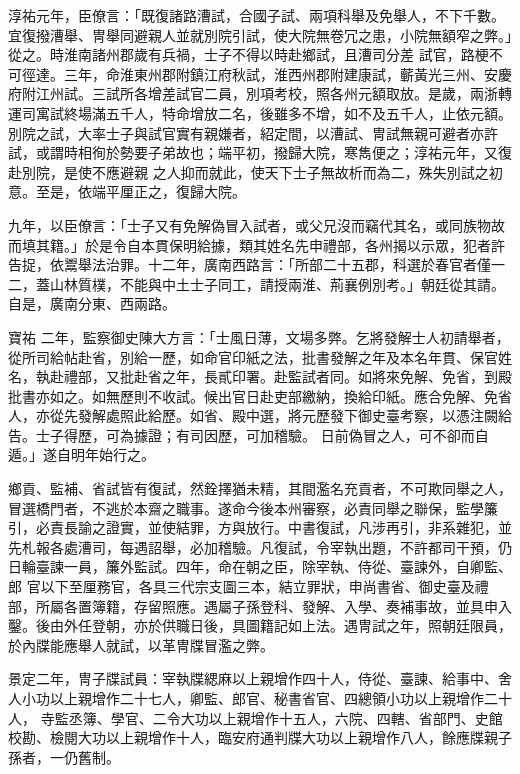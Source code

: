 \begin{pinyinscope}
 淳祐元年，臣僚言：「既復諸路漕試，合國子試、兩項科舉及免舉人，不下千數。宜復撥漕舉、冑舉同避親人並就別院引試，使大院無卷冗之患，小院無額窄之弊。」從之。時淮南諸州郡歲有兵禍，士子不得以時赴鄉試，且漕司分差
 試官，路梗不可徑達。三年，命淮東州郡附鎮江府秋試，淮西州郡附建康試，蘄黃光三州、安慶府附江州試。三試所各增差試官二員，別項考校，照各州元額取放。是歲，兩浙轉運司寓試終場滿五千人，特命增放二名，後雖多不增，如不及五千人，止依元額。別院之試，大率士子與試官實有親嫌者，紹定間，以漕試、冑試無親可避者亦許試，或謂時相徇於勢要子弟故也；端平初，撥歸大院，寒雋便之；淳祐元年，又復赴別院，是使不應避親
 之人抑而就此，使天下士子無故析而為二，殊失別試之初意。至是，依端平厘正之，復歸大院。



 九年，以臣僚言：「士子又有免解偽冒入試者，或父兄沒而竊代其名，或同族物故而填其籍。」於是令自本貫保明給據，類其姓名先申禮部，各州揭以示眾，犯者許告捉，依鬻舉法治罪。十二年，廣南西路言：「所部二十五郡，科選於春官者僅一二，蓋山林質樸，不能與中土士子同工，請授兩淮、荊襄例別考。」朝廷從其請。自是，廣南分東、西兩路。



 寶祐
 二年，監察御史陳大方言：「士風日薄，文場多弊。乞將發解士人初請舉者，從所司給帖赴省，別給一歷，如命官印紙之法，批書發解之年及本名年貫、保官姓名，執赴禮部，又批赴省之年，長貳印署。赴監試者同。如將來免解、免省，到殿批書亦如之。如無歷則不收試。候出官日赴吏部繳納，換給印紙。應合免解、免省人，亦從先發解處照此給歷。如省、殿中選，將元歷發下御史臺考察，以憑注闕給告。士子得歷，可為據證；有司因歷，可加稽驗。
 日前偽冒之人，可不卻而自遁。」遂自明年始行之。



 鄉貢、監補、省試皆有復試，然銓擇猶未精，其間濫名充貢者，不可欺同舉之人，冒選橋門者，不逃於本齋之職事。遂命今後本州審察，必責同舉之聯保，監學簾引，必責長諭之證實，並使結罪，方與放行。中書復試，凡涉再引，非系雜犯，並先札報各處漕司，每遇詔舉，必加稽驗。凡復試，令宰執出題，不許都司干預，仍日輪臺諫一員，簾外監試。四年，命在朝之臣，除宰執、侍從、臺諫外，自卿監、郎
 官以下至厘務官，各具三代宗支圖三本，結立罪狀，申尚書省、御史臺及禮部，所屬各置簿籍，存留照應。遇屬子孫登科、發解、入學、奏補事故，並具申入鑿。後由外任登朝，亦於供職日後，具圖籍記如上法。遇冑試之年，照朝廷限員，於內牒能應舉人就試，以革冑牒冒濫之弊。



 景定二年，冑子牒試員：宰執牒緦麻以上親增作四十人，侍從、臺諫、給事中、舍人小功以上親增作二十七人，卿監、郎官、秘書省官、四總領小功以上親增作二十人，
 寺監丞簿、學官、二令大功以上親增作十五人，六院、四轄、省部門、史館校勘、檢閱大功以上親增作十人，臨安府通判牒大功以上親增作八人，餘應牒親子孫者，一仍舊制。




\end{pinyinscope}
